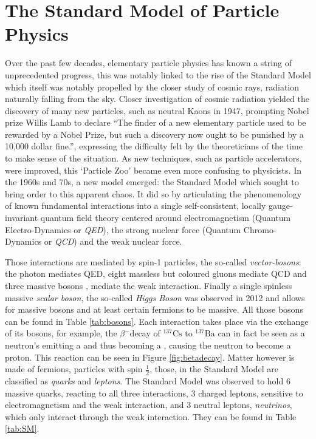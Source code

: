 
 
 \chapter{The Standard Model of Particle Physics}
 
 
 
Over the past few decades, elementary particle physics has known a string of unprecedented progress, this was notably linked to the rise of the Standard Model which itself was notably propelled by the closer study of cosmic rays, radiation naturally falling from the sky.
Closer investigation of cosmic radiation yielded the discovery of many new particles, such as neutral Kaons \PKzero in 1947, prompting Nobel prize Willis Lamb to declare ``The finder of a new elementary particle used to be rewarded by a Nobel Prize, but such a discovery now ought to be punished by a 10,000 dollar fine.'', expressing the difficulty felt by the theoreticians of the time to make sense of the situation. As new techniques, such as particle accelerators, were improved, this `Particle Zoo' became even more confusing to physicists. In the 1960s and 70s, a new model emerged: the Standard Model which sought to bring order to this apparent chaos. It did so by articulating the phenomenology of known fundamental interactions into a single self-consistent, locally gauge-invariant quantum field theory centered around electromagnetism (Quantum Electro-Dynamics or \textit{QED}), the strong nuclear force (Quantum Chromo-Dynamics or \textit{QCD}) and the weak nuclear force.

Those interactions are mediated by spin-1 particles, the so-called \textit{vector-bosons}: the photon \Pgamma mediates QED, eight massless but coloured gluons \Pgluon mediate QCD and three massive bosons \PZ, \PWpm mediate the weak interaction. Finally a single spinless massive \textit{scalar boson}, the so-called \textit{Higgs Boson} was observed in 2012 and allows for massive bosons and at least certain fermions to be massive. All those bosons can be found in Table \ref{tab:bosons}. Each interaction takes place via the exchange of its bosons, for example, the $\beta^{-}$decay of $^{137}\text{Cs}$ to $^{137}\text{Ba}$ can in fact be seen as a neutron's \Pdown emitting a \PWminus and thus becoming a \Pup, causing the neutron to become a proton. This reaction can be seen in Figure \ref{fig:betadecay}.
Matter however is made of fermions, particles with spin $\frac{1}{2}$, those, in the Standard Model are classified as \textit{quarks} and \textit{leptons}.
The Standard Model was observed to hold  6 massive quarks, reacting to all three interactions, 3 charged leptons, sensitive to electromagnetism and the weak interaction, and 3 neutral leptons, \textit{neutrinos}, which only interact through the weak interaction. They can be found in Table \ref{tab:SM}.


